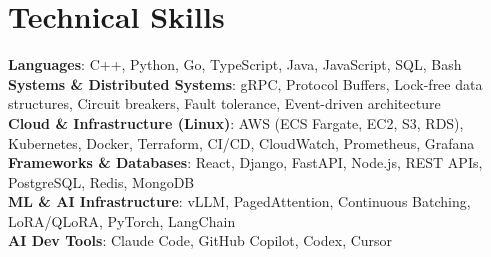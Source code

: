 \documentclass[letterpaper,11pt]{article}
\begin{document}
\section{Technical Skills}
\vspace{-7pt}
\begin{itemize}
[leftmargin=0.15in, label={}]\small{\item{
        \textbf{Languages}{: C++, Python, Go, TypeScript, Java, JavaScript, SQL, Bash} \\
        \textbf{Systems \& Distributed Systems}{: gRPC, Protocol Buffers, Lock-free data structures, Circuit breakers, Fault tolerance, Event-driven architecture} \\
        \textbf{Cloud \& Infrastructure (Linux)}{: AWS (ECS Fargate, EC2, S3, RDS), Kubernetes, Docker, Terraform, CI/CD, CloudWatch, Prometheus, Grafana} \\
        \textbf{Frameworks \& Databases}{: React, Django, FastAPI, Node.js, REST APIs, PostgreSQL, Redis, MongoDB} \\
        \textbf{ML \& AI Infrastructure}{: vLLM, PagedAttention, Continuous Batching, LoRA/QLoRA, PyTorch, LangChain} \\
        \textbf{AI Dev Tools}{: Claude Code, GitHub Copilot, Codex, Cursor} \\
}}
\end{itemize}
\end{document}
